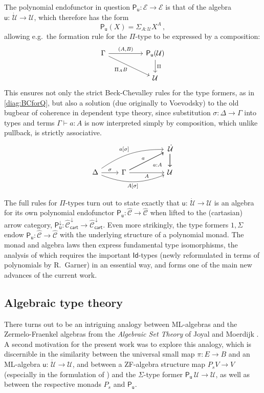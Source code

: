 \documentclass[12pt,reqno]{amsart}
\newcommand{\CC}{\ensuremath{\mathcal{C}}}
\newcommand{\EE}{\ensuremath{\mathcal{E}}}
\newcommand{\alg}[1]{\ensuremath{\mathsf{#1}}}
\renewcommand{\to}{\ensuremath{\rightarrow}}
\newcommand{\too}{\ensuremath{\longrightarrow}}
\newcommand{\Id}{\mathsf{Id}}
\newcommand{\U}{\ensuremath{\mathcal{U}}}
\newcommand{\UU}{\ensuremath{\,\dot{\mathcal{U}}}}
\renewcommand{\u}{\ensuremath{\mathsf{u}}}
\renewcommand{\t}{\ensuremath{\mathsf{u}}}
\theoremstyle{remark}
\theoremstyle{definition}
\begin{document}
The polynomial endofunctor in question $\alg{P}_\t : \EE \to \EE$  is that of the algebra $\u:\UU \to \U$, which therefore has the form
\[
\alg{P}_{\u}(X) = \Sigma_{A: \U} X^A\,,
\]
allowing e.g.\ the formation rule for the $\Pi$-type to be expressed by a composition:
\begin{equation*}
\begin{tikzcd}
 \Gamma \ar[rr, "{(A,B)}" ] \ar[rrd,swap,  "{\Pi_A B}"] &&\alg{P}_\u (\U) \ar[d, "{\Pi}"] \\
 && \U
\end{tikzcd}
\end{equation*} 
This ensures not only the strict Beck-Chevalley rules for the type formers, as in \eqref{diag:BCforQ}, but also a solution (due originally to Voevodsky) to the old bugbear of coherence in dependent type theory, since substitution $\sigma : \Delta \to \Gamma$ into types and terms $\Gamma \vdash a:A$ is now interpreted simply by composition, which unlike pullback, is strictly associative.
\[
\begin{tikzcd}
 	&&&  {\UU} \ar[d]\ar[d]\\
\Delta \ar[r,  "{\sigma}"] \ar[rrru, bend left = 4ex, "{a[\sigma]}"]\ar[rrr, swap, bend right = 5ex, "{A[\sigma]}"] & \Gamma \ar[rru, "a"]   \ar[rru, swap, "{\ \ a:A}"]  \ar[rr ,swap,  "A"]  && {\U}
\end{tikzcd}
\]

The full rules for $\Pi$-types turn out to state exactly that $\u : \UU\to\U$ is an algebra for its own polynomial endofunctor $\alg{P}_{\u} : \widehat{\CC} \to \widehat{\CC}$ when lifted to the (cartasian) arrow category, $\alg{P}_{\u}^{\downarrow}: \widehat{\CC}^{\,\downarrow}_{\mathsf{cart}} \too \widehat{\CC}^{\,\downarrow}_{\mathsf{cart}}$.
Even more strikingly, the type formers $1, \Sigma$ endow $\alg{P}_{\u} : \widehat{\CC} \to \widehat{\CC}$ with the underlying structure of a polynomial monad.  The monad and algebra laws then express fundamental type isomorphisms, the analysis of which requires the important $\Id{}$-types (newly reformulated in terms of polynomials by R.\ Garner) in an essential way, and forms one of the main new advances of the current work.

\subsection*{Algebraic type theory} There turns out to be an intriguing analogy between ML-algebras and the Zermelo-Fraenkel algebras from the \emph{Algebraic Set Theory} of Joyal and Moerdijk \cite{JM:AST}.  A second motivation for the present work was to explore this analogy, which is discernible in the similarity between the universal small map $\pi : E \to B$ and an ML-algebra $\u : \UU \to \U$, and between a ZF-algebra structure map $P_sV \to V$ (especially in the formulation of \cite{Simpson:1999}) and the $\Sigma$-type former $\alg{P}_{\!\u}\, \U \to \U$, as well as between the respective monads $P_s$ and $\alg{P}_{\!\u}$. 
\end{document}
